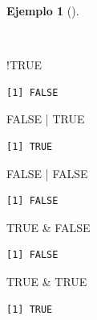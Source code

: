 \documentclass[
  a4paper,
]{scrreport}
\newenvironment{Shaded}{\begin{snugshade}}{\end{snugshade}}
\newcommand{\ConstantTok}[1]{\textcolor[rgb]{0.56,0.35,0.01}{#1}}
\newcommand{\SpecialCharTok}[1]{\textcolor[rgb]{0.37,0.37,0.37}{#1}}
\theoremstyle{definition}
\theoremstyle{definition}
\newtheorem{example}{Ejemplo}[chapter]
\theoremstyle{remark}
\begin{document}
\begin{example}[]\protect\hypertarget{exm-operadores-logicos}{}\label{exm-operadores-logicos}

~

\begin{Shaded}
\begin{Highlighting}[]
\SpecialCharTok{!}\ConstantTok{TRUE}
\end{Highlighting}
\end{Shaded}

\begin{verbatim}
[1] FALSE
\end{verbatim}

\begin{Shaded}
\begin{Highlighting}[]
\ConstantTok{FALSE} \SpecialCharTok{|} \ConstantTok{TRUE}
\end{Highlighting}
\end{Shaded}

\begin{verbatim}
[1] TRUE
\end{verbatim}

\begin{Shaded}
\begin{Highlighting}[]
\ConstantTok{FALSE} \SpecialCharTok{|} \ConstantTok{FALSE}
\end{Highlighting}
\end{Shaded}

\begin{verbatim}
[1] FALSE
\end{verbatim}

\begin{Shaded}
\begin{Highlighting}[]
\ConstantTok{TRUE} \SpecialCharTok{\&} \ConstantTok{FALSE}
\end{Highlighting}
\end{Shaded}

\begin{verbatim}
[1] FALSE
\end{verbatim}

\begin{Shaded}
\begin{Highlighting}[]
\ConstantTok{TRUE} \SpecialCharTok{\&} \ConstantTok{TRUE}
\end{Highlighting}
\end{Shaded}

\begin{verbatim}
[1] TRUE
\end{verbatim}

\end{example}
\end{document}
